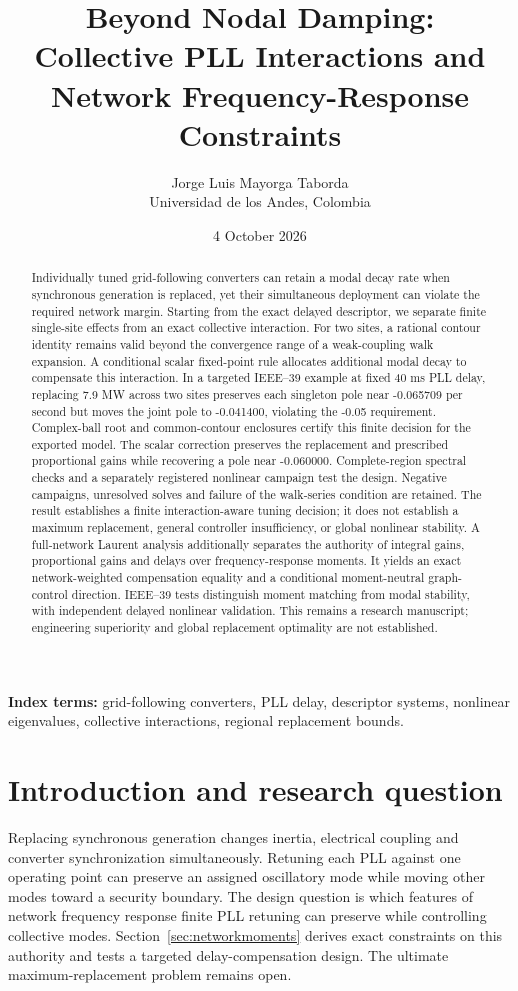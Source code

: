 \documentclass[11pt]{article}
\title{Beyond Nodal Damping:\\Collective PLL Interactions and Network Frequency-Response Constraints}
\author{Jorge Luis Mayorga Taborda\\Universidad de los Andes, Colombia}
\date{4 October 2026}
\begin{document}
\maketitle
\begin{abstract}
Individually tuned grid-following converters can retain a modal decay rate
when synchronous generation is replaced, yet their simultaneous deployment
can violate the required network margin. Starting from the exact delayed
descriptor, we separate finite single-site effects from an exact collective
interaction. For two sites, a rational contour identity remains valid beyond
the convergence range of a weak-coupling walk expansion. A conditional scalar
fixed-point rule allocates additional modal decay to compensate this interaction.
In a targeted IEEE--39 example at fixed 40 ms PLL delay, replacing 7.9 MW
across two sites preserves each singleton pole near -0.065709 per second but
moves the joint pole to -0.041400, violating the -0.05 requirement. Complex-ball
root and common-contour enclosures certify this finite decision for the exported
model. The scalar correction preserves the replacement and prescribed
proportional gains while recovering a pole near -0.060000. Complete-region
spectral checks and a separately registered nonlinear campaign test the design.
Negative campaigns, unresolved solves and failure of the walk-series condition
are retained. The result establishes a finite interaction-aware tuning decision;
it does not establish a maximum replacement, general controller insufficiency,
or global nonlinear stability.
 A full-network Laurent analysis additionally separates the authority of integral gains, proportional gains and delays over frequency-response moments. It yields an exact network-weighted compensation equality and a conditional moment-neutral graph-control direction. IEEE--39 tests distinguish moment matching from modal stability, with independent delayed nonlinear validation. This remains a research manuscript; engineering superiority and global replacement optimality are not established.
\end{abstract}
\noindent\textbf{Index terms:} grid-following converters, PLL delay,
descriptor systems, nonlinear eigenvalues, collective interactions,
regional replacement bounds.

\section{Introduction and research question}
Replacing synchronous generation changes inertia, electrical coupling
and converter synchronization simultaneously. Retuning each PLL against
one operating point can preserve an assigned oscillatory mode while
moving other modes toward a security boundary. The design question is
which features of network frequency response finite PLL retuning can preserve
while controlling collective modes. Section~\ref{sec:networkmoments} derives
exact constraints on this authority and tests a targeted delay-compensation
design. The ultimate maximum-replacement problem remains open.
\end{document}

